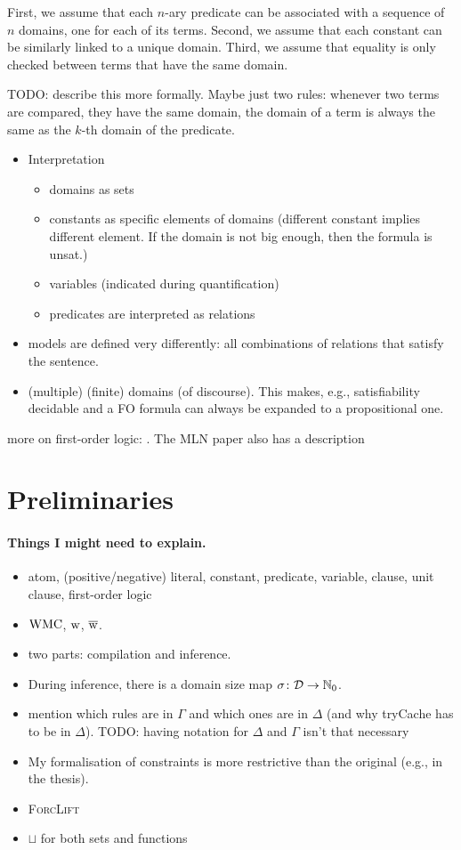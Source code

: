 First, we assume that each $n$-ary predicate can be associated with a sequence of $n$ domains, one for each of its terms. Second, we assume that each constant can be similarly linked to a unique domain. Third, we assume that equality is only checked between terms that have the same domain.

TODO: describe this more formally. Maybe just two rules: whenever two terms are compared, they have the same domain, the domain of a term is always the same as the $k$-th domain of the predicate.

\begin{itemize}
\item Interpretation
  \begin{itemize}
  \item domains as sets
  \item constants as specific elements of domains (different constant implies different element. If the domain is not big enough, then the formula is unsat.)
  \item variables (indicated during quantification)
  \item predicates are interpreted as relations
  \end{itemize}
\item models are defined very differently: all combinations of relations that satisfy the sentence.
\item (multiple) (finite) domains (of discourse). This makes, e.g., satisfiability decidable and a FO formula can always be expanded to a propositional one.
\end{itemize}

more on first-order logic: \citep{DBLP:books/daglib/0023546}. The MLN paper also has a description

\section{Preliminaries}

\paragraph{Things I might need to explain.}
\begin{itemize}
\item atom, (positive/negative) literal, constant, predicate, variable, clause, unit clause, first-order logic
\item $\operatorname{WMC}$, $\operatorname{w}$, $\operatorname{\overline{w}}$.
\item two parts: compilation and inference.
\item During inference, there is a domain size map $\operatorname{\sigma}\colon \mathcal{D} \to \mathbb{N}_0$.
\item mention which rules are in $\Gamma$ and which ones are in $\Delta$ (and why tryCache has to be in $\Delta$). TODO: having notation for $\Delta$ and $\Gamma$ isn't that necessary
\item My formalisation of constraints is more restrictive than the original (e.g., in the thesis).
\item \textsc{ForcLift}
\item $\sqcup$ for both sets and functions
\end{itemize}

